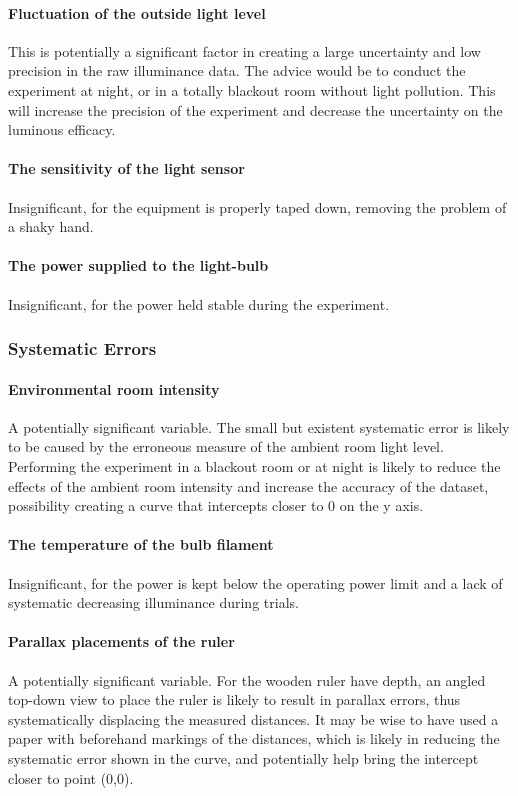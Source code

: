 \documentclass[a4paper,12pt]{article}
\begin{document}
\paragraph{Fluctuation of the outside light level} This is potentially a significant factor in creating a large uncertainty and low precision in the raw illuminance data. The advice would be to conduct the experiment at night, or in a totally blackout room without light pollution. This will increase the precision of the experiment and decrease the uncertainty on the luminous efficacy.

\paragraph{The sensitivity of the light sensor} Insignificant, for the equipment is properly taped down, removing the problem of a shaky hand.

\paragraph{The power supplied to the light-bulb}
Insignificant, for the power held stable during the experiment.

\subsubsection{Systematic Errors}
\paragraph{Environmental room intensity}
A potentially significant variable. The small but existent systematic error is likely to be caused by the erroneous measure of the ambient room light level. Performing the experiment in a blackout room or at night is likely to reduce the effects of the ambient room intensity and increase the accuracy of the dataset, possibility creating a curve that intercepts closer to 0 on the y axis.

\paragraph{The temperature of the bulb filament}
Insignificant, for the power is kept below the operating power limit and a lack of systematic decreasing illuminance during trials.

\paragraph{Parallax placements of the ruler}
A potentially significant variable. For the wooden ruler have depth, an angled top-down view to place the ruler is likely to result in parallax errors, thus systematically displacing the measured distances. It may be wise to have used a paper with beforehand markings of the distances, which is likely in reducing the systematic error shown in the curve, and potentially help bring the intercept closer to point (0,0).
\end{document}
